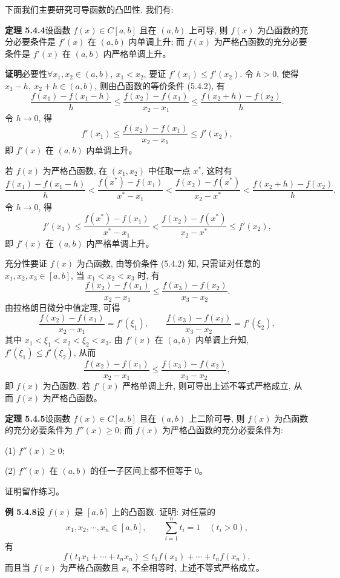 \documentclass[UTF8,12pt,a4paper,fontset=fandol]{ctexart}
\begin{document}
下面我们主要研究可导函数的凸凹性. 我们有:

\noindent\textbf{定理 5.4.4}\quad 设函数 $f(x)\in C[a,b]$ 且在 $(a,b)$ 上可导, 则 $f(x)$ 为凸函数的充分必要条件是 $f'(x)$ 在 $(a,b)$ 内单调上升; 而 $f(x)$ 为严格凸函数的充分必要条件是 $f'(x)$ 在 $(a,b)$ 内严格单调上升。

\noindent\textbf{证明}\quad 必要性\quad $\forall x_1,x_2\in(a,b),\ x_1<x_2$, 要证 $f'(x_1)\leqslant f'(x_2)$. 令 $h>0$, 使得 $x_1-h,\ x_2+h\in(a,b)$, 则由凸函数的等价条件 (5.4.2), 有
\[
  \frac{f(x_1)-f(x_1-h)}{h}
  \leqslant
  \frac{f(x_2)-f(x_1)}{x_2-x_1}
  \leqslant
  \frac{f(x_2+h)-f(x_2)}{h}.
\]
令 $h\to0$, 得
\[
  f'(x_1)\leqslant\frac{f(x_2)-f(x_1)}{x_2-x_1}\leqslant f'(x_2),
\]
即 $f'(x)$ 在 $(a,b)$ 内单调上升。

若 $f(x)$ 为严格凸函数, 在 $(x_1,x_2)$ 中任取一点 $x^*$, 这时有
\[
  \frac{f(x_1)-f(x_1-h)}{h}
  <
  \frac{f(x^*)-f(x_1)}{x^*-x_1}
  <
  \frac{f(x_2)-f(x^*)}{x_2-x^*}
  <
  \frac{f(x_2+h)-f(x_2)}{h}.
\]
令 $h\to0$, 得
\[
  f'(x_1)\leqslant
  \frac{f(x^*)-f(x_1)}{x^*-x_1}
  <
  \frac{f(x_2)-f(x^*)}{x_2-x^*}
  \leqslant f'(x_2),
\]
即 $f'(x)$ 在 $(a,b)$ 内严格单调上升。

充分性\quad 要证 $f(x)$ 为凸函数, 由等价条件 (5.4.2) 知, 只需证对任意的 $x_1,x_2,x_3\in[a,b]$, 当 $x_1<x_2<x_3$ 时, 有
\[
  \frac{f(x_2)-f(x_1)}{x_2-x_1}
  \leqslant
  \frac{f(x_3)-f(x_2)}{x_3-x_2}.
\]
由拉格朗日微分中值定理, 可得
\[
  \frac{f(x_2)-f(x_1)}{x_2-x_1}=f'(\xi_1),\qquad
  \frac{f(x_3)-f(x_2)}{x_3-x_2}=f'(\xi_2),
\]
其中 $x_1<\xi_1<x_2<\xi_2<x_3$. 由 $f'(x)$ 在 $(a,b)$ 内单调上升知, $f'(\xi_1)\leqslant f'(\xi_2)$, 从而
\[
  \frac{f(x_2)-f(x_1)}{x_2-x_1}
  \leqslant
  \frac{f(x_3)-f(x_2)}{x_3-x_2},
\]
即 $f(x)$ 为凸函数. 若 $f'(x)$ 严格单调上升, 则可导出上述不等式严格成立, 从而 $f(x)$ 为严格凸函数。

\noindent\textbf{定理 5.4.5}\quad 设函数 $f(x)\in C[a,b]$ 且在 $(a,b)$ 上二阶可导, 则 $f(x)$ 为凸函数的充分必要条件为 $f''(x)\geqslant0$; 而 $f(x)$ 为严格凸函数的充分必要条件为:

(1) $f''(x)\geqslant0$;

(2) $f''(x)$ 在 $(a,b)$ 的任一子区间上都不恒等于 $0$。

证明留作练习。

\noindent\textbf{例 5.4.8}\quad 设 $f(x)$ 是 $[a,b]$ 上的凸函数. 证明: 对任意的
\[
  x_1,x_2,\cdots,x_n\in[a,b],\qquad
  \sum_{i=1}^n t_i=1\quad (t_i>0),
\]
有
\[
  f(t_1x_1+\cdots+t_nx_n)\leqslant t_1f(x_1)+\cdots+t_nf(x_n),
\]
而且当 $f(x)$ 为严格凸函数且 $x_i$ 不全相等时, 上述不等式严格成立。
\end{document}
